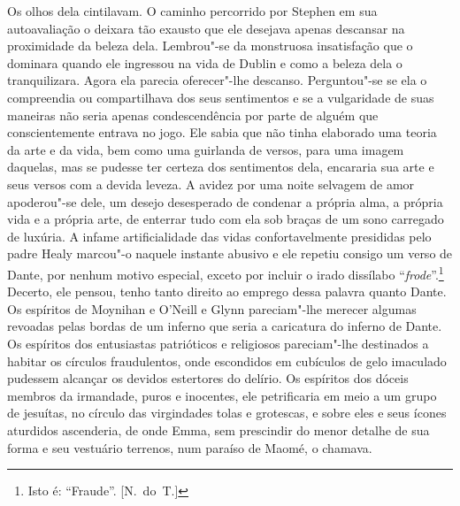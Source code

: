 Os olhos dela cintilavam.  O caminho percorrido por Stephen em sua
autoavaliação o deixara tão exausto que ele desejava apenas descansar na
proximidade da beleza dela.  Lembrou"-se da monstruosa insatisfação que o
dominara quando ele ingressou na vida de Dublin e como a beleza dela o
tranquilizara.  Agora ela parecia oferecer"-lhe descanso.  Perguntou"-se se ela o
compreendia ou compartilhava dos seus sentimentos e se a vulgaridade de suas
maneiras não seria apenas condescendência por parte de alguém que
conscientemente entrava no jogo.  Ele sabia que não tinha elaborado uma teoria
da arte e da vida, bem como uma guirlanda de versos, para uma imagem daquelas,
mas se pudesse ter certeza dos sentimentos dela, encararia sua arte e seus
versos com a devida leveza.  A avidez por uma noite selvagem de amor
apoderou"-se dele, um desejo desesperado de condenar a própria alma, a própria
vida e a própria arte, de enterrar tudo com ela sob braças de um sono
\label{carregado"-de} carregado de luxúria.  A infame artificialidade das vidas confortavelmente
presididas pelo padre Healy marcou"-o naquele instante abusivo e ele repetiu
consigo um verso de Dante, por nenhum motivo especial, exceto por incluir o
irado dissílabo “\textit{frode}”.\footnote{ Isto é: “Fraude”. [N.~do~T.]}
Decerto, ele pensou, tenho tanto direito ao emprego dessa palavra quanto Dante.
Os espíritos de Moynihan e O’Neill e Glynn pareciam"-lhe merecer algumas
revoadas pelas bordas de um inferno que seria a caricatura do inferno de Dante.
Os espíritos dos entusiastas patrióticos e religiosos pareciam"-lhe destinados a
habitar os círculos fraudulentos, onde escondidos em cubículos de gelo
imaculado pudessem alcançar os devidos estertores do delírio.  Os espíritos dos
dóceis membros da irmandade, puros e inocentes, ele petrificaria em meio a um
grupo de jesuítas, no círculo das virgindades tolas e grotescas, e sobre eles e
seus ícones aturdidos ascenderia, de onde Emma, sem prescindir do menor detalhe
de sua forma e seu vestuário terrenos, num paraíso de Maomé, o chamava.

